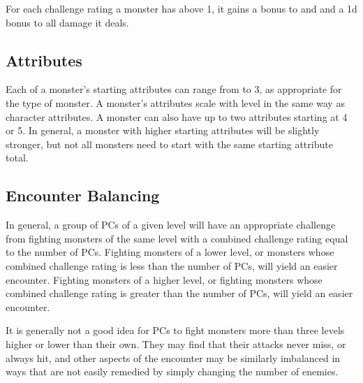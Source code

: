          For each challenge rating a monster has above 1, it gains a  bonus to  and  and a \plus1d bonus to all damage it deals.

    \subsection{Attributes}
        Each of a monster's starting attributes can range from  to 3, as appropriate for the type of monster.
        A monster's attributes scale with level in the same way as character attributes.
        A monster can also have up to two attributes starting at 4 or 5.
        In general, a monster with higher starting attributes will be slightly stronger, but not all monsters need to start with the same starting attribute total.

    \subsection{Encounter Balancing}
        In general, a group of PCs of a given level will have an appropriate challenge from fighting monsters of the same level with a combined challenge rating equal to the number of PCs.
        Fighting monsters of a lower level, or monsters whose combined challenge rating is less than the number of PCs, will yield an easier encounter.
        Fighting monsters of a higher level, or fighting monsters whose combined challenge rating is greater than the number of PCs, will yield an easier encounter.

        It is generally not a good idea for PCs to fight monsters more than three levels higher or lower than their own.
        They may find that their attacks never miss, or always hit, and other aspects of the encounter may be similarly imbalanced in ways that are not easily remedied by simply changing the number of enemies.


